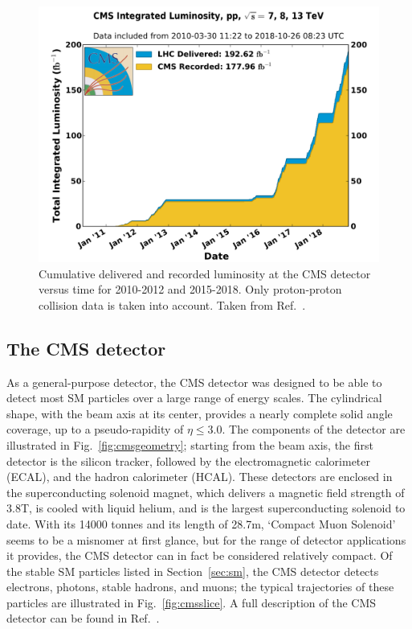 \begin{figure}[hbtp]
  \begin{center}
    \includegraphics[width=0.7\linewidth]{img/detector/cmslumi.pdf}
    \caption{
        Cumulative delivered and recorded luminosity at the CMS detector versus time for 2010-2012 and 2015-2018.
        Only proton-proton collision data is taken into account.
        Taken from Ref.~\cite{cmslumi}.
        }
    \label{fig:cmslumi}
  \end{center}
\end{figure}


\subsection{The CMS detector}
\label{sec:cmsdetector}

As a general-purpose detector, the CMS detector was designed to be able to detect most SM particles over a large range of energy scales.
% 
The cylindrical shape, with the beam axis at its center, provides a nearly complete solid angle coverage, up to a pseudo-rapidity of $\eta \leq 3.0$.
% 
The components of the detector are illustrated in Fig.~\ref{fig:cmsgeometry}; starting from the beam axis, the first detector is the silicon tracker, followed by the electromagnetic calorimeter (ECAL), and the hadron calorimeter (HCAL).
% 
These detectors are enclosed in the superconducting solenoid magnet, which delivers a magnetic field strength of 3.8\unit{T}, is cooled with liquid helium, and is the largest superconducting solenoid to date.
% 
With its 14000 tonnes and its length of 28.7\unit{m}, `Compact Muon Solenoid' seems to be a misnomer at first glance, but for the range of detector applications it provides, the CMS detector can in fact be considered relatively compact.
% 
Of the stable SM particles listed in Section~\ref{sec:sm}, the CMS detector detects electrons, photons, stable hadrons, and muons; the typical trajectories of these particles are illustrated in Fig.~\ref{fig:cmsslice}.
% 
A full description of the CMS detector can be found in Ref.~\cite{Chatrchyan:2008zzk}.


